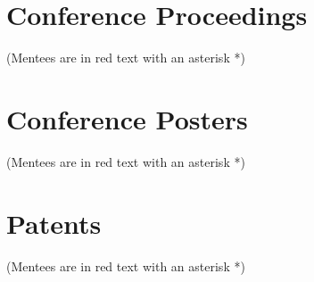 \documentclass[11pt, letterpaper]{article}
\begin{document}
\section{Conference Proceedings}
(Mentees are in red text with an asterisk *)
\nocite{*}
\begin{refcontext}[labelprefix=C]
    \printbibliography[heading=none, type=inproceedings, sorting=pubdate, title={Conference Papers}]
\end{refcontext}

\section{Conference Posters}
(Mentees are in red text with an asterisk *)
\nocite{*}
\begin{refcontext}[labelprefix=P]
    \printbibliography[heading=none, type=misc, keyword=poster, title={Posters}]
\end{refcontext}

\section{Patents}
(Mentees are in red text with an asterisk *)
\nocite{*}
\begin{refcontext}[labelprefix=P]
    \printbibliography[heading=none, type=patent, title={Patents}]
\end{refcontext}
\end{document}
